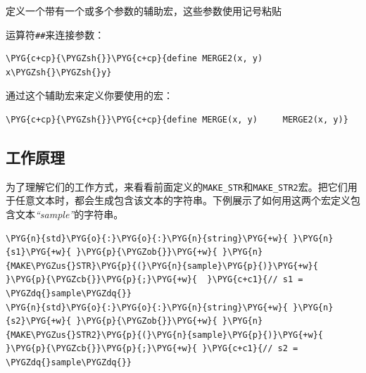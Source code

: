 
定义一个带有一个或多个参数的辅助宏，这些参数使用记号粘贴



运算符\texttt{\#\#}来连接参数：



\begin{codeblockbg}
\begin{Verbatim}[commandchars=\\\{\},breaklines=true,breakanywhere=true,fontsize=\codefont,xleftmargin=17bp]
\PYG{c+cp}{\PYGZsh{}}\PYG{c+cp}{define MERGE2(x, y)    x\PYGZsh{}\PYGZsh{}y}
\end{Verbatim}
\end{codeblockbg}



通过这个辅助宏来定义你要使用的宏：



\begin{codeblockbg}
\begin{Verbatim}[commandchars=\\\{\},breaklines=true,breakanywhere=true,fontsize=\codefont,xleftmargin=17bp]
\PYG{c+cp}{\PYGZsh{}}\PYG{c+cp}{define MERGE(x, y)     MERGE2(x, y)}
\end{Verbatim}
\end{codeblockbg}



\subsection{工作原理}



为了理解它们的工作方式，来看看前面定义的\texttt{MAKE\_\allowbreak{}STR}和\texttt{MAKE\_\allowbreak{}STR2}宏。把它们用于任意文本时，都会生成包含该文本的字符串。下例展示了如何用这两个宏定义包含文本\textit{“sample”}的字符串。



\begin{codeblockbg}
\begin{Verbatim}[commandchars=\\\{\},breaklines=true,breakanywhere=true,fontsize=\codefont,xleftmargin=17bp]
\PYG{n}{std}\PYG{o}{:}\PYG{o}{:}\PYG{n}{string}\PYG{+w}{ }\PYG{n}{s1}\PYG{+w}{ }\PYG{p}{\PYGZob{}}\PYG{+w}{ }\PYG{n}{MAKE\PYGZus{}STR}\PYG{p}{(}\PYG{n}{sample}\PYG{p}{)}\PYG{+w}{ }\PYG{p}{\PYGZcb{}}\PYG{p}{;}\PYG{+w}{  }\PYG{c+c1}{// s1 = \PYGZdq{}sample\PYGZdq{}}
\PYG{n}{std}\PYG{o}{:}\PYG{o}{:}\PYG{n}{string}\PYG{+w}{ }\PYG{n}{s2}\PYG{+w}{ }\PYG{p}{\PYGZob{}}\PYG{+w}{ }\PYG{n}{MAKE\PYGZus{}STR2}\PYG{p}{(}\PYG{n}{sample}\PYG{p}{)}\PYG{+w}{ }\PYG{p}{\PYGZcb{}}\PYG{p}{;}\PYG{+w}{ }\PYG{c+c1}{// s2 = \PYGZdq{}sample\PYGZdq{}}
\end{Verbatim}
\end{codeblockbg}


